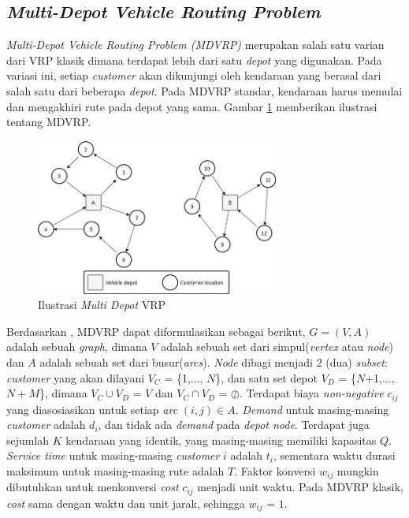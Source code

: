 \subsection{\textit{Multi-Depot Vehicle Routing Problem}}
\label{ssec:mdvrp}
\textit{Multi-Depot Vehicle Routing Problem (MDVRP)} merupakan salah satu varian dari VRP klasik dimana terdapat lebih dari satu \textit{depot} yang digunakan. Pada variasi ini, setiap \textit{customer} akan dikunjungi oleh kendaraan yang berasal dari salah satu dari beberapa \textit{depot}. Pada MDVRP standar, kendaraan harus memulai dan mengakhiri rute pada depot yang sama. Gambar \ref{fig:mdvrp-illustration} memberikan ilustrasi tentang MDVRP.


\begin{figure}[h]
	\centering
	\includegraphics[width=8cm]{Resources/Images/mdvrp-illustration}
	\caption{Ilustrasi \textit{Multi Depot} VRP}
	\label{fig:mdvrp-illustration}
\end{figure}


Berdasarkan \citep{renaud_tabu_1996}, MDVRP dapat diformulasikan sebagai berikut, $G = (V, A)$ adalah sebuah \textit{graph}, dimana $V$ adalah sebuah set dari simpul(\textit{vertex} atau \textit{node}) dan $A$ adalah sebuah set dari busur(\textit{arcs}). \textit{Node} dibagi menjadi 2 (dua) \textit{subset}: \textit{customer} yang akan dilayani $V_C$ = \{1,..., $N$\}, dan satu set depot $V_D$ = \{$N$+1,..., $N+M$\}, dimana $V_C \cup V_D$ = $V$ dan $V_C \cap V_D$ = $\oslash$. Terdapat biaya \textit{non-negative} $c_{ij}$ yang diasosiasikan untuk setiap \textit{arc} $(i, j) \in A$. \textit{Demand} untuk masing-masing \textit{customer} adalah $d_i$, dan tidak ada \textit{demand} pada \textit{depot node}. Terdapat juga sejumlah $K$ kendaraan yang identik, yang masing-masing memiliki kapasitas $Q$. \textit{Service time} untuk masing-masing \textit{customer} $i$ adalah $t_i$, sementara waktu durasi maksimum untuk masing-masing rute adalah $T$. Faktor konversi $w_{ij}$ mungkin dibutuhkan untuk menkonversi \textit{cost} $c_{ij}$ menjadi unit waktu. Pada MDVRP klasik, \textit{cost} sama dengan waktu dan unit jarak, sehingga $w_{ij}$ = $1$.


